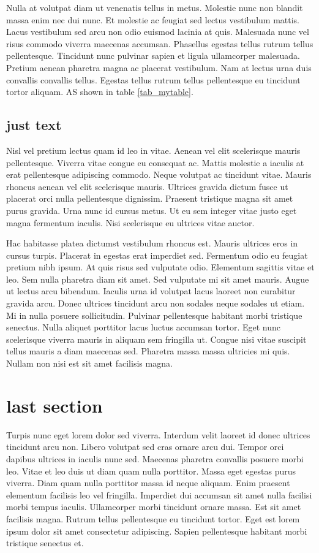 \documentclass[]{article}
\begin{document}
Nulla at volutpat diam ut venenatis tellus in metus. Molestie nunc non blandit massa enim nec dui nunc. Et molestie ac feugiat sed lectus vestibulum mattis. Lacus vestibulum sed arcu non odio euismod lacinia at quis. Malesuada nunc vel risus commodo viverra maecenas accumsan. Phasellus egestas tellus rutrum tellus pellentesque. Tincidunt nunc pulvinar sapien et ligula ullamcorper malesuada. Pretium aenean pharetra magna ac placerat vestibulum. Nam at lectus urna duis convallis convallis tellus. Egestas tellus rutrum tellus pellentesque eu tincidunt tortor aliquam.
AS shown in table \ref{tab_mytable}.

\subsection{just text}
Nisl vel pretium lectus quam id leo in vitae. Aenean vel elit scelerisque mauris pellentesque. Viverra vitae congue eu consequat ac. Mattis molestie a iaculis at erat pellentesque adipiscing commodo. Neque volutpat ac tincidunt vitae. Mauris rhoncus aenean vel elit scelerisque mauris. Ultrices gravida dictum fusce ut placerat orci nulla pellentesque dignissim. Praesent tristique magna sit amet purus gravida. Urna nunc id cursus metus. Ut eu sem integer vitae justo eget magna fermentum iaculis. Nisi scelerisque eu ultrices vitae auctor.

Hac habitasse platea dictumst vestibulum rhoncus est. Mauris ultrices eros in cursus turpis. Placerat in egestas erat imperdiet sed. Fermentum odio eu feugiat pretium nibh ipsum. At quis risus sed vulputate odio. Elementum sagittis vitae et leo. Sem nulla pharetra diam sit amet. Sed vulputate mi sit amet mauris. Augue ut lectus arcu bibendum. Iaculis urna id volutpat lacus laoreet non curabitur gravida arcu. Donec ultrices tincidunt arcu non sodales neque sodales ut etiam. Mi in nulla posuere sollicitudin. Pulvinar pellentesque habitant morbi tristique senectus. Nulla aliquet porttitor lacus luctus accumsan tortor. Eget nunc scelerisque viverra mauris in aliquam sem fringilla ut. Congue nisi vitae suscipit tellus mauris a diam maecenas sed. Pharetra massa massa ultricies mi quis. Nullam non nisi est sit amet facilisis magna.

\section{last section}
Turpis nunc eget lorem dolor sed viverra. Interdum velit laoreet id donec ultrices tincidunt arcu non. Libero volutpat sed cras ornare arcu dui. Tempor orci dapibus ultrices in iaculis nunc sed. Maecenas pharetra convallis posuere morbi leo. Vitae et leo duis ut diam quam nulla porttitor. Massa eget egestas purus viverra. Diam quam nulla porttitor massa id neque aliquam. Enim praesent elementum facilisis leo vel fringilla. Imperdiet dui accumsan sit amet nulla facilisi morbi tempus iaculis. Ullamcorper morbi tincidunt ornare massa. Est sit amet facilisis magna. Rutrum tellus pellentesque eu tincidunt tortor. Eget est lorem ipsum dolor sit amet consectetur adipiscing. Sapien pellentesque habitant morbi tristique senectus et.
\end{document}

